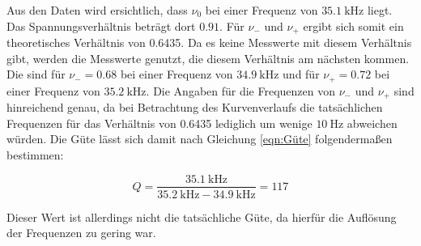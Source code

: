 Aus den Daten wird ersichtlich, dass $\nu_0$ bei einer Frequenz von $\SI{35.1}{\kilo\hertz}$ liegt.
Das Spannungsverhältnis beträgt dort $0.91$.
Für $\nu_-$ und $\nu_+$ ergibt sich somit ein theoretisches Verhältnis von 0.6435.
Da es keine Messwerte mit diesem Verhältnis gibt, werden die Messwerte genutzt, die diesem Verhältnis am nächsten kommen.
Die sind für $\nu_- = 0.68$ bei einer Frequenz von $\SI{34.9}{\kilo\hertz}$ und für $\nu_+ = 0.72$ bei einer Frequenz von $\SI{35.2}{\kilo\hertz}$.
Die Angaben für die Frequenzen von $\nu_-$ und $\nu_+$ sind hinreichend genau, da bei Betrachtung des Kurvenverlaufs die tatsächlichen Frequenzen für das Verhältnis von 0.6435 lediglich um wenige $\SI{10}{\hertz}$ abweichen würden.
Die Güte lässt sich damit nach Gleichung \eqref{eqn:Güte} folgendermaßen bestimmen:

\begin{equation*}
  Q = \frac{\SI{35.1}{\kilo\hertz}}{\SI{35.2}{\kilo\hertz} - \SI{34.9}{\kilo\hertz}} = 117
\end{equation*}

Dieser Wert ist allerdings nicht die tatsächliche Güte, da hierfür die Auflösung der Frequenzen zu gering war.

